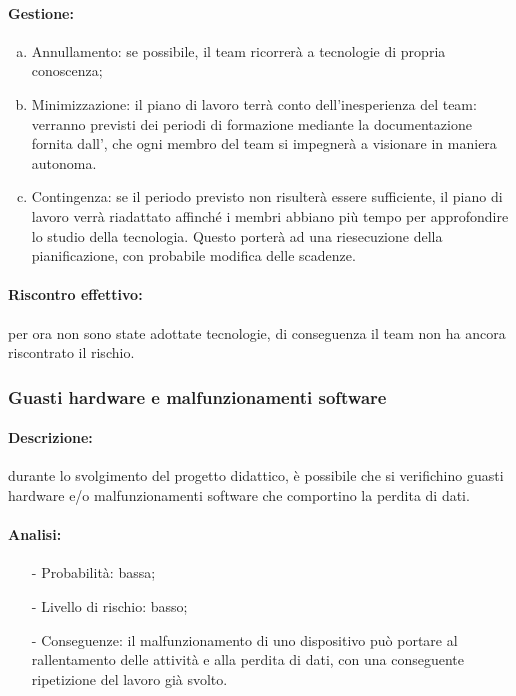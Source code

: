 \documentclass[../PianoProgetto.tex]{subfiles}
\begin{document}
	\paragraph*{Gestione:}
	\begin{enumerate}[(a)]
		\item Annullamento: se possibile, il team ricorrerà a tecnologie di propria conoscenza;
		\item Minimizzazione: il piano di lavoro terrà conto dell’inesperienza del team: verranno previsti dei periodi di formazione mediante la documentazione fornita dall’\amministratore, che ogni membro del team si impegnerà a visionare in maniera autonoma.
		\item Contingenza: se il periodo previsto non risulterà essere sufficiente, il piano di lavoro verrà riadattato affinché i membri abbiano più tempo per approfondire lo studio della tecnologia. Questo porterà ad una riesecuzione della pianificazione, con probabile modifica delle scadenze.
	\end{enumerate} 
	
	\paragraph*{Riscontro effettivo:} per ora non sono state adottate tecnologie, di conseguenza il team non ha ancora riscontrato il rischio.

	\subsubsection{Guasti hardware e malfunzionamenti software}
	
	\paragraph*{Descrizione:} durante lo svolgimento del progetto didattico, è possibile che si verifichino guasti hardware e/o malfunzionamenti software che comportino la perdita di dati.
	
	\paragraph*{Analisi:}
	\begin{itemize}
		\item[-] Probabilità: bassa;
		\item[-] Livello di rischio: basso;
		\item[-] Conseguenze: il malfunzionamento di uno dispositivo può portare al rallentamento delle attività e alla perdita di dati, con una conseguente ripetizione del lavoro già svolto.
	\end{itemize}
	
\end{document}
